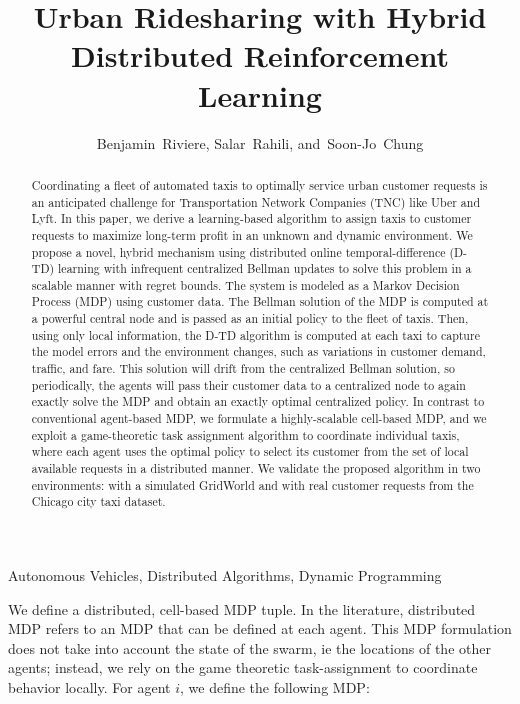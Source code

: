 \documentclass[journal]{IEEEtran}
\begin{document}
\title{Urban Ridesharing with Hybrid Distributed Reinforcement Learning}

\author{Benjamin~Riviere,
        Salar~Rahili,
        and~Soon-Jo~Chung}

\maketitle

\begin{abstract}
Coordinating a fleet of automated taxis to optimally service urban customer requests is an anticipated challenge for Transportation Network Companies (TNC) like Uber and Lyft. In this paper, we derive a learning-based algorithm to assign taxis to customer requests to maximize long-term profit in an unknown and dynamic environment. We propose a novel, hybrid mechanism using distributed online temporal-difference (D-TD) learning with infrequent centralized Bellman updates to solve this problem in a scalable manner with regret bounds. The system is modeled as a Markov Decision Process (MDP) using customer data. The Bellman solution of the MDP is computed at a powerful central node and is passed as an initial policy to the fleet of taxis. Then, using only local information, the D-TD algorithm is computed at each taxi to capture the model errors and the environment changes, such as variations in customer demand, traffic, and fare. This solution will drift from the centralized Bellman solution, so periodically, the agents will pass their customer data to a centralized node to again exactly solve the MDP and obtain an exactly optimal centralized policy. In contrast to conventional agent-based MDP, we formulate a highly-scalable cell-based  MDP, and we exploit a game-theoretic task assignment algorithm to coordinate individual taxis, where each agent uses the optimal policy to select its customer from the set of local available requests in a distributed manner. We validate the proposed algorithm in two environments: with a simulated GridWorld and with real customer requests from the Chicago city taxi dataset. 
\end{abstract}

\begin{IEEEkeywords}
Autonomous Vehicles, Distributed Algorithms, Dynamic Programming
\end{IEEEkeywords}

\newpage 

We define a distributed, cell-based MDP tuple. In the literature, distributed MDP refers to an MDP that can be defined at each agent. This MDP formulation does not take into account the state of the swarm, ie the locations of the other agents; instead, we rely on the game theoretic task-assignment to coordinate behavior locally. For agent $i$, we define the following MDP:
\end{document}
